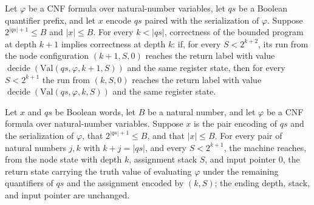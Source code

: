 \begin{theorem}
\label{Complexity.LogProg.TQBFARM.inner_spec}
\leanok
{}
Let $\varphi$ be a CNF formula over natural-number variables, let $qs$ be a Boolean quantifier prefix, and let $x$ encode $qs$ paired with the serialization of $\varphi$. Suppose $2^{|qs|+1}\le B$ and $|x|\le B$. For every $k<|qs|$, correctness of the bounded program at depth $k+1$ implies correctness at depth $k$: if, for every $S<2^{k+2}$, its run from the node configuration $(k+1,S,0)$ reaches the return label with value $\operatorname{decide}(\mathrm{Val}(qs,\varphi,k+1,S))$ and the same register state, then for every $S<2^{k+1}$ the run from $(k,S,0)$ reaches the return label with value $\operatorname{decide}(\mathrm{Val}(qs,\varphi,k,S))$ and the same register state.
\end{theorem}

\begin{theorem}
\label{Complexity.LogProg.TQBFARM.call_spec}
\leanok
{}
Let $x$ and $qs$ be Boolean words, let $B$ be a natural number, and let $\varphi$ be a
CNF formula over natural-number variables. Suppose $x$ is the pair encoding of $qs$ and
the serialization of $\varphi$, that $2^{|qs|+1}\le B$, and that $|x|\le B$. For every
pair of natural numbers $j,k$ with $k+j=|qs|$, and every $S<2^{k+1}$, the machine
reaches, from the node state with depth $k$, assignment stack $S$, and input pointer
$0$, the return state carrying the truth value of evaluating $\varphi$ under the
remaining quantifiers of $qs$ and the assignment encoded by $(k,S)$; the ending depth,
stack, and input pointer are unchanged.
\end{theorem}


